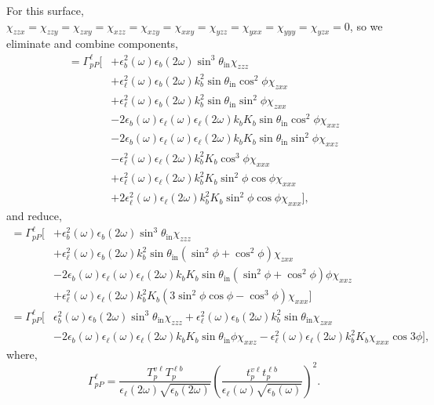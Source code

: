 For this surface, $\chi_{zzx}=\chi_{zzy}=\chi_{zxy}=\chi_{xzz}=\chi_{xzy}=
\chi_{xxy}=\chi_{yzz}=\chi_{yxx}=\chi_{yyy}=\chi_{yzx}=0$, so we eliminate and
combine components,
\begin{equation*}
\begin{split}
= \Gamma^{\ell}_{pP}
\big[
&+ \epsilon_{b}^{2}(\omega)\epsilon_{b}(2\omega)
   \sin^{3}\theta_{\mathrm{in}}\chi_{zzz}\\
&+ \epsilon_{\ell}^{2}(\omega)\epsilon_{b}(2\omega)k^{2}_{b}
   \sin\theta_{\mathrm{in}}\cos^{2}\phi\chi_{zxx}\\
&+ \epsilon_{\ell}^{2}(\omega)\epsilon_{b}(2\omega)k^{2}_{b}
   \sin\theta_{\mathrm{in}}\sin^{2}\phi\chi_{zxx}\\
&- 2\epsilon_{b}(\omega)\epsilon_{\ell}(\omega)\epsilon_{\ell}(2\omega)k_{b}K_{b}
   \sin\theta_{\mathrm{in}}\cos^{2}\phi\chi_{xxz}\\
&- 2\epsilon_{b}(\omega)\epsilon_{\ell}(\omega)\epsilon_{\ell}(2\omega)k_{b}K_{b}
   \sin\theta_{\mathrm{in}}\sin^{2}\phi\chi_{xxz}\\
&- \epsilon_{\ell}^{2}(\omega)\epsilon_{\ell}(2\omega)k^{2}_{b}K_{b}
   \cos^{3}\phi\chi_{xxx}\\
&+ \epsilon_{\ell}^{2}(\omega)\epsilon_{\ell}(2\omega)k^{2}_{b}K_{b}
   \sin^{2}\phi\cos\phi\chi_{xxx}\\
&+ 2\epsilon^{2}_{\ell}(\omega)\epsilon_{\ell}(2\omega)k^{2}_{b}K_{b}
   \sin^{2}\phi\cos\phi\chi_{xxx}
\big],
\end{split}
\end{equation*}
and reduce,
\begin{equation*}
\begin{split}
= \Gamma^{\ell}_{pP}
\big[
&+ \epsilon_{b}^{2}(\omega)\epsilon_{b}(2\omega)
   \sin^{3}\theta_{\mathrm{in}}\chi_{zzz}\\
&+ \epsilon_{\ell}^{2}(\omega)\epsilon_{b}(2\omega)k^{2}_{b}
   \sin\theta_{\mathrm{in}}(\sin^{2}\phi + \cos^{2}\phi)\chi_{zxx}\\
&- 2\epsilon_{b}(\omega)\epsilon_{\ell}(\omega)\epsilon_{\ell}(2\omega)k_{b}K_{b}
   \sin\theta_{\mathrm{in}}(\sin^{2}\phi + \cos^{2}\phi)\phi\chi_{xxz}\\
&+ \epsilon^{2}_{\ell}(\omega)\epsilon_{\ell}(2\omega)k^{2}_{b}K_{b}
   (3\sin^{2}\phi\cos\phi - \cos^{3}\phi)\chi_{xxx}
\big]\\
= \Gamma^{\ell}_{pP}
\big[
& \epsilon_{b}^{2}(\omega)\epsilon_{b}(2\omega)
  \sin^{3}\theta_{\mathrm{in}}\chi_{zzz}
+ \epsilon_{\ell}^{2}(\omega)\epsilon_{b}(2\omega)k^{2}_{b}
  \sin\theta_{\mathrm{in}}\chi_{zxx}\\
&- 2\epsilon_{b}(\omega)\epsilon_{\ell}(\omega)\epsilon_{\ell}(2\omega)k_{b}K_{b}
   \sin\theta_{\mathrm{in}}\phi\chi_{xxz}
 - \epsilon^{2}_{\ell}(\omega)\epsilon_{\ell}(2\omega)k^{2}_{b}K_{b}\chi_{xxx}
   \cos3\phi
\big],
\end{split}
\end{equation*}
where,
\begin{equation*}
\Gamma^{\ell}_{pP} =
\frac{T^{v\ell}_{p}T^{\ell b}_{p}}
     {\epsilon_{\ell}({2\omega})\sqrt{\epsilon_{b}(2\omega)}}
\left(\frac{t^{v\ell}_{p}t^{\ell b}_{p}}
{\epsilon_{\ell}(\omega)\sqrt{\epsilon_{b}(\omega)}}\right)^{2}.
\end{equation*}


